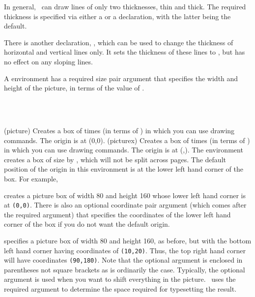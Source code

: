   In general, \ltx\ can draw lines of only two 
thicknesses, 
thin and thick. The required
thickness is specified via either a \cmd{\thicklines} or a \cmd{\thinlines}
declaration, with the latter being the default. 

There is another declaration, \cmd{\linethickness}, which can be used 
to change the thickness of horizontal and vertical lines only.
It sets the thickness of these lines to , but has no effect on
any sloping lines.

    A  environment has a required size pair argument that
specifies the width and height of the picture, in terms of the value
of \cmd{\unitlength}.
\begin{syntax}
 \\
 \\
\end{syntax}
\glossary(picture)
{}{Creates a box of  times 
   (in terms of ) in which you can use drawing
   commands. The origin is at (0,0).}
\glossary(picturex)
{}{Creates a box of  times 
   (in terms of ) in which you can use drawing
  commands. The origin is at (,).}
 The environment creates a box 
of size  by , which will not be
split across pages. The default position of
the origin in this environment is at the lower left hand corner of the box.
For example,
creates a picture box of width 80 and height 160 whose lower left hand corner
is at \texttt{(0,0)}. There is also an optional coordinate pair argument (which
comes after the required argument) that specifies the coordinates of the
lower left hand corner of the box if you do not want the default origin.
specifies a picture box of width 80 and height 160, as before, but with
the bottom left hand corner having coordinates of \texttt{(10,20)}. Thus, the
top right hand corner will have coordinates \texttt{(90,180)}. Note that the
optional argument is enclosed in parentheses not square brackets as is 
ordinarily the case. Typically, the optional argument is used when you
want to shift everything in the picture. \ltx\ uses the required argument
to determine the space required for typesetting the result. 

